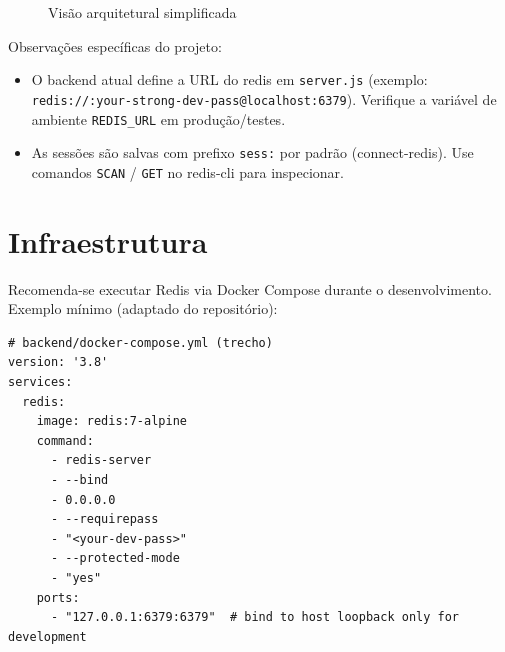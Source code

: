 \documentclass[a4paper,11pt]{article}
\begin{document}
\begin{figure}[h!]
\centering
{}
\caption{Visão arquitetural simplificada}
\end{figure}

Observações específicas do projeto:
\begin{itemize}
\item O backend atual define a URL do redis em \texttt{server.js} (exemplo: \texttt{redis://:your-strong-dev-pass@localhost:6379}). Verifique a variável de ambiente \texttt{REDIS_URL} em produção/testes.
\item As sessões são salvas com prefixo \texttt{sess:} por padrão (connect-redis). Use comandos \texttt{SCAN} / \texttt{GET} no redis-cli para inspecionar.
\end{itemize}

\section{Infraestrutura}
Recomenda-se executar Redis via Docker Compose durante o desenvolvimento. Exemplo mínimo (adaptado do repositório):

\begin{lstlisting}
# backend/docker-compose.yml (trecho)
version: '3.8'
services:
  redis:
    image: redis:7-alpine
    command:
      - redis-server
      - --bind
      - 0.0.0.0
      - --requirepass
      - "<your-dev-pass>"
      - --protected-mode
      - "yes"
    ports:
      - "127.0.0.1:6379:6379"  # bind to host loopback only for development
\end{lstlisting}
\end{document}
